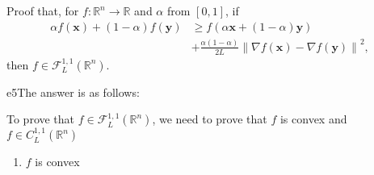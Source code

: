 \documentclass{article}
\newcommand{\xB}{\bm{x}}
\newcommand{\yB}{\bm{y}}
\newcommand{\RBB}{\mathbb{R}}
\newcommand{\FM}{\mathcal{F}}
\newcommand{\functiontype}[3]{\FM_{#1}^{#2,#3}(\RBB^n)}
\newcommand{\normgen}[1]{\left\| #1 \right\|}
\begin{document}
\begin{excercise}\label{e5}
Proof that, for $f: \RBB^n \rightarrow \RBB$ and $\alpha$ from $[0,1]$,  if
\begin{align*} 
	\alpha f(\xB) + (1-\alpha) f(\yB) &\geq f( \alpha \xB + (1-\alpha) \yB) \nonumber \\
	&+ \frac{\alpha(1-\alpha)}{2L} \normgen{\nabla f(\xB) - \nabla f(\yB)}^2, 
\end{align*}
then $f \in \functiontype{L}{1}{1}$.
\end{excercise}
\begin{PROOF}{e5}The answer is as follows:

	To prove that $f \in \functiontype{L}{1}{1}$, we need to prove that 
	$f$ is convex and $f \in C_{L}^{1,1}(\RBB^n)$

	\begin{enumerate}
		\item $f$ is convex
		

\end{enumerate}
\end{PROOF}
\end{document}
